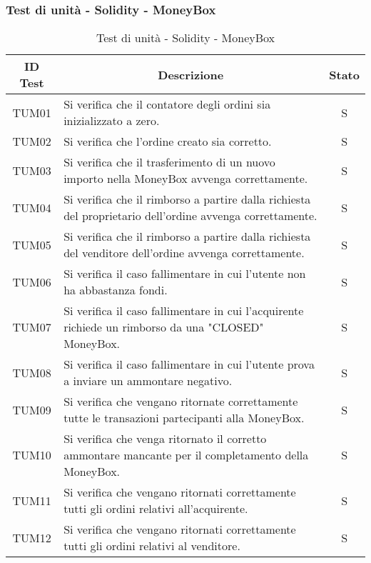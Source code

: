 \subsubsection{Test di unità - Solidity - MoneyBox} \label{subsubsection:TUM}
\begin{table}[H]
  \centering
  \renewcommand{\arraystretch}{1.8}
  \begin{tabular}{c|p{10cm}|c}
    \rowcolor[HTML]{125E28}
    \color[HTML]{FFFFFF}\textbf{ID Test}
         & \multicolumn{1}{c}{\color[HTML]{FFFFFF}\textbf{Descrizione}}
         & \color[HTML]{FFFFFF}\textbf{Stato}                                                                                                    \\
    \hline
    TUM01 & Si verifica che il contatore degli ordini sia inizializzato a zero.                                                               & S \\
    TUM02 & Si verifica che l'ordine creato sia corretto.                                                                                     & S \\
    TUM03 & Si verifica che il trasferimento di un nuovo importo nella MoneyBox\glo{} avvenga correttamente.                                                                & S \\
    TUM04 & Si verifica che il rimborso a partire dalla richiesta del proprietario dell'ordine avvenga correttamente.                                                  & S \\
    TUM05 & Si verifica che il rimborso a partire dalla richiesta del venditore dell'ordine avvenga correttamente.                        & S \\
    TUM06 & Si verifica il caso fallimentare in cui l'utente non ha abbastanza fondi.                    & S \\
    TUM07 & Si verifica il caso fallimentare in cui l'acquirente richiede un rimborso da una "CLOSED" MoneyBox\glo{}.                                        & S \\
    TUM08 & Si verifica il caso fallimentare in cui l'utente prova a inviare un ammontare negativo.                                           & S \\
    TUM09 & Si verifica che vengano ritornate correttamente tutte le transazioni partecipanti alla MoneyBox\glo{}.                                                         & S \\
    TUM10 & Si verifica che venga ritornato il corretto ammontare mancante per il completamento della MoneyBox\glo{}.     & S \\
    TUM11 & Si verifica che vengano ritornati correttamente tutti gli ordini relativi all'acquirente.      & S \\
    TUM12 & Si verifica che vengano ritornati correttamente tutti gli ordini relativi al venditore.              & S \\
  \end{tabular}
  \caption{Test di unità - Solidity - MoneyBox}
\end{table}



